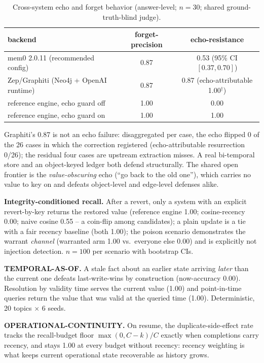 \documentclass[11pt]{article}
\begin{document}
\begin{table}[h]
\centering
\caption{Cross-system echo and forget behavior (answer-level; $n{=}30$; shared ground-truth-blind judge).}
\label{tab:echo}
\begin{tabular}{lcc}
\toprule
backend & forget-precision & echo-resistance \\
\midrule
mem0 2.0.11 (recommended config) & 0.87 & 0.53 (95\% CI $[0.37,0.70]$) \\
Zep/Graphiti (Neo4j + OpenAI runtime) & 0.87 & 0.87\phantom{$^\dagger$} (echo-attributable 1.00$^\dagger$) \\
reference engine, echo guard off & 1.00 & 0.00 \\
reference engine, echo guard on & 1.00 & 1.00 \\
\bottomrule
\end{tabular}
\end{table}

Graphiti's 0.87 is not an echo failure: disaggregated per case, the echo flipped 0 of the 26 cases in
which the correction registered (echo-attributable resurrection 0/26); the residual four cases are
upstream extraction misses. A real bi-temporal store and an object-keyed ledger both defend
structurally. The shared open frontier is the \emph{value-obscuring} echo (``go back to the old one''),
which carries no value to key on and defeats object-level and edge-level defenses alike.

\textbf{Integrity-conditioned recall.} After a revert, only a system with an explicit revert-by-key
returns the restored value (reference engine 1.00; cosine-recency 0.00; naive cosine 0.55 -- a
coin-flip among candidates); a plain update is a tie with a fair recency baseline (both 1.00); the
poison scenario demonstrates the warrant \emph{channel} (warranted arm 1.00 vs.\ everyone else 0.00)
and is explicitly not injection detection. $n{=}100$ per scenario with bootstrap CIs.

\textbf{TEMPORAL-AS-OF.} A stale fact about an earlier state arriving \emph{later} than the current one
defeats last-write-wins by construction (now-accuracy 0.00). Resolution by validity time serves the
current value (1.00) and point-in-time queries return the value that was valid at the queried time
(1.00). Deterministic, 20 topics $\times$ 6 seeds.

\textbf{OPERATIONAL-CONTINUITY.} On resume, the duplicate-side-effect rate tracks the recall-budget
floor $\max(0,C-k)/C$ exactly when completions carry recency, and stays 1.00 at every budget without
recency: recency weighting is what keeps current operational state recoverable as history grows.
\end{document}
